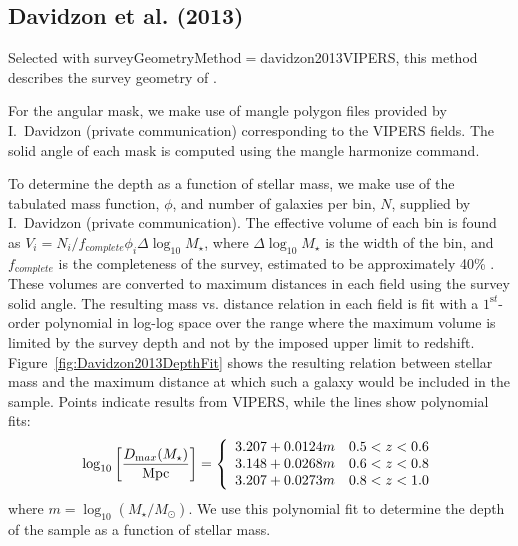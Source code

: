 \subsection{Davidzon et al. (2013)}\label{phys:surveyGeometry:surveyGeometryDavidzon2013VIPERS}

Selected with {\normalfont \ttfamily surveyGeometryMethod}$=${\normalfont \ttfamily davidzon2013VIPERS}, this method describes the survey geometry of \cite{davidzon_vimos_2013}. 

For the angular mask, we make use of {\normalfont \ttfamily mangle} polygon files provided by I.~Davidzon (private communication) corresponding to the VIPERS fields. The solid angle of each mask is computed using the {\normalfont \ttfamily mangle} {\normalfont \ttfamily harmonize} command.

To determine the depth as a function of stellar mass, we make use of the tabulated mass function, $\phi$, and number of galaxies per bin, $N$, supplied by I.~Davidzon (private communication). The effective volume of each bin is found as $V_i = N_i/f_{\mathrm complete}\phi_i\Delta\log_{10}M_\star$, where $\Delta\log_{10}M_\star$ is the width of the bin, and $f_{\mathrm complete}$ is the completeness of the survey, estimated to be approximately 40\% \citep{guzzo_vimos_2013}. These volumes are converted to maximum distances in each field using the survey solid angle. The resulting mass vs. distance relation in each field is fit with a $1^{\mathrm st}$-order polynomial in log-log space over the range where the maximum volume is limited by the survey depth and not by the imposed upper limit to redshift. Figure~\ref{fig:Davidzon2013DepthFit} shows the resulting relation between stellar mass and the maximum distance at which such a galaxy would be included in the sample. Points indicate results from VIPERS, while the lines show polynomial fits:
\begin{equation}
 \log_{10} \left[ {D_{\mathrm max}(M_\star) \over \hbox{Mpc}}\right] = \left\{ \begin{array}{ll} 3.207 + 0.0124m & 0.5 < z < 0.6 \\ 3.148 + 0.0268m & 0.6 < z < 0.8  \\ 3.207 + 0.0273m & 0.8 < z < 1.0 \end{array} \right.
 \label{eq:DavidzonDepthPolynomial}
\end{equation}
where $m= \log_{10}(M_\star/M_\odot)$. We use this polynomial fit to determine the depth of the sample as a function of stellar mass.

